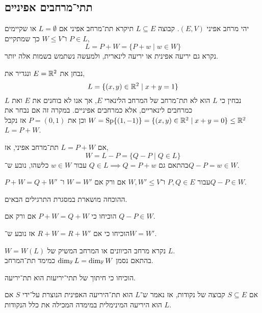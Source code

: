 \subsection{תתי־מרחבים אפיניים}
\begin{definition}
	יהי מרחב אפיני $(E, V)$.
	קבוצה $L \subseteq E$ תיקרא תת־מרחב אפיני אם $L = \emptyset$ או שקיימים $P \in L$ ו־$W \le V$ כך שמתקיים,
	\[
		L
		= P + W
		= \{ P + w \mid w \in W \}
	\]
	נקרא גם יריעה אפינית או יריעה לינארית, ולמעשה נשתמש בשמות אלה יותר.
\end{definition}
\begin{example}
	נבחן את $E = \mathbb{R}^2$ ונגדיר את,
	\[
		L = \{ (x, y) \in \mathbb{R}^2 \mid x + y = 1 \}
	\]
	נבחין כי $L$ הוא לא תת־מרחב של המרחב הלינארי $E$, אך אנו לא בוחנים את $E$ ואת $L$ כמרחבים לינאריים, אלא כמרחבים אפיניים.
	במקרה זה אם נבחר את $W = \operatorname{Sp}\{ (1, -1) \} = \{ (x, y) \in \mathbb{R}^2 \mid x + y = 0 \} \le \mathbb{R}^2$ וכן את $P = (0, 1)$ אז נקבל $L = P + W$.
\end{example}
\begin{remark}
	אם $L = P + W$ תת־מרחב אפיני, אז,
	\[
		W
		= L - P
		= \{ Q - P \mid Q \in L \}
	\]
	בהתאם גם $Q \in L \implies Q = P + w$ עבור $w \in W$ כלשהו, נובע ש־$Q - P = w \in W$.
\end{remark}
\begin{theorem}
	$P + W = Q + W'$ עבור $P, Q \in E$ ו־$W, W' \le V$ אם ורק אם $W = W'$ ו־$Q - P \in W$.
\end{theorem}
ההוכחה מושארת במסגרת התרגילים הבאים.
\begin{exercise}
	הוכיחו כי $P + W = Q + W$ אם ורק אם $Q - P \in W$.
\end{exercise}
\begin{exercise}
	הוכיחו כי אם $R + W = R + W'$ אז נובע ש־$W = W'$.
\end{exercise}
\begin{definition}
	$W = W(L)$ נקרא מרחב הכיוונים או המרחב המשיק של $L$. \\
	בהתאם נסמן $\dim_{\mathbb{F}} L = \dim_{\mathbb{F}} W$ כמימד תת־המרחב.
\end{definition}
\begin{exercise}
	הוכיחו כי חיתוך של תתי־יריעות הוא תת־יריעה.
\end{exercise}
\begin{definition}
	אם $S \subseteq E$ קבוצה של נקודות, אז נאמר ש־$L$ הוא תת־היריעה האפינית הנוצרת על־ידי $S$ אם $L$ הוא היריעה המינימלית במימדה המכילה את כלל הנקודות.
\end{definition}
